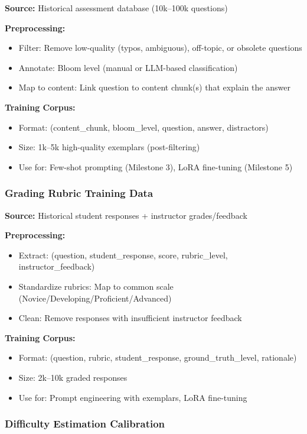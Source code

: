 \documentclass[11pt,letterpaper]{article}
\begin{document}
\textbf{Source:} Historical assessment database (10k--100k questions)

\textbf{Preprocessing:}
\begin{itemize}
\item Filter: Remove low-quality (typos, ambiguous), off-topic, or obsolete questions
\item Annotate: Bloom level (manual or LLM-based classification)
\item Map to content: Link question to content chunk(s) that explain the answer
\end{itemize}

\textbf{Training Corpus:}
\begin{itemize}
\item Format: (content\_chunk, bloom\_level, question, answer, distractors)
\item Size: 1k--5k high-quality exemplars (post-filtering)
\item Use for: Few-shot prompting (Milestone 3), LoRA fine-tuning (Milestone 5)
\end{itemize}

\subsubsection{Grading Rubric Training Data}\label{subsubsec:grading-rubric-training}

\textbf{Source:} Historical student responses + instructor grades/feedback

\textbf{Preprocessing:}
\begin{itemize}
\item Extract: (question, student\_response, score, rubric\_level, instructor\_feedback)
\item Standardize rubrics: Map to common scale (Novice/Developing/Proficient/Advanced)
\item Clean: Remove responses with insufficient instructor feedback
\end{itemize}

\textbf{Training Corpus:}
\begin{itemize}
\item Format: (question, rubric, student\_response, ground\_truth\_level, rationale)
\item Size: 2k--10k graded responses
\item Use for: Prompt engineering with exemplars, LoRA fine-tuning
\end{itemize}

\subsubsection{Difficulty Estimation Calibration}\label{subsubsec:difficulty-calibration}
\end{document}
